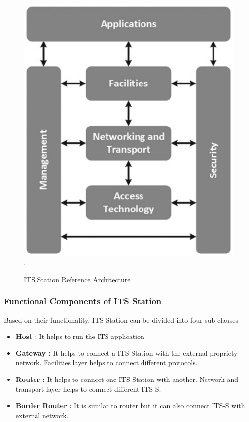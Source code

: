 \begin{figure}[h!]
    \centering
    \includegraphics[scale=0.40]{Framework/Images/ITS-SRefArc.png}.
    \caption{ITS Station Reference Architecture }
    \label{ci88ts-s}
\end{figure}

\subsubsection{Functional Components of ITS Station}
 Based on their functionality, ITS Station can be divided into four sub-clauses \cite{etsi}
\begin{itemize}
    \item \textbf{Host :} It helps to run the ITS application
    \item \textbf{Gateway :} It helps to connect a ITS Station with the external propriety network. Facilities layer helps to connect different protocols.
    \item \textbf{Router :} It helps to connect one ITS Station with another. Network and transport layer helps to connect different ITS-S.
    \item \textbf{Border Router :}  It is similar to router but it can also connect ITS-S with external network.
    
\end{itemize}

